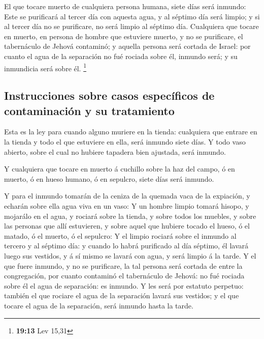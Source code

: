  El que tocare muerto de cualquiera persona humana, siete
días será inmundo:  Este se purificará al tercer día con
aquesta agua, y al séptimo día será limpio; y si al tercer día no se
purificare, no será limpio al séptimo día.  Cualquiera
que tocare en muerto, en persona de hombre que estuviere muerto, y no se
purificare, el tabernáculo de Jehová contaminó; y aquella persona será
cortada de Israel: por cuanto el agua de la separación no fué rociada
sobre él, inmundo será; y su inmundicia será sobre él. \footnote{\textbf{19:13}
  Lev 15,31}

\hypertarget{instrucciones-sobre-casos-especuxedficos-de-contaminaciuxf3n-y-su-tratamiento}{%
\subsection{Instrucciones sobre casos específicos de contaminación y su
tratamiento}\label{instrucciones-sobre-casos-especuxedficos-de-contaminaciuxf3n-y-su-tratamiento}}

 Esta es la ley para cuando alguno muriere en la tienda:
cualquiera que entrare en la tienda y todo el que estuviere en ella,
será inmundo siete días.  Y todo vaso abierto, sobre el
cual no hubiere tapadera bien ajustada, será inmundo.

 Y cualquiera que tocare en muerto á cuchillo sobre la
haz del campo, ó en muerto, ó en hueso humano, ó en sepulcro, siete días
será inmundo.

 Y para el inmundo tomarán de la ceniza de la quemada
vaca de la expiación, y echarán sobre ella agua viva en un vaso:
 Y un hombre limpio tomará hisopo, y mojarálo en el agua,
y rociará sobre la tienda, y sobre todos los muebles, y sobre las
personas que allí estuvieren, y sobre aquel que hubiere tocado el hueso,
ó el matado, ó el muerto, ó el sepulcro:  Y el limpio
rociará sobre el inmundo al tercero y al séptimo día: y cuando lo habrá
purificado al día séptimo, él lavará luego sus vestidos, y á sí mismo se
lavará con agua, y será limpio á la tarde.  Y el que
fuere inmundo, y no se purificare, la tal persona será cortada de entre
la congregación, por cuanto contaminó el tabernáculo de Jehová: no fué
rociada sobre él el agua de separación: es inmundo.  Y
les será por estatuto perpetuo: también el que rociare el agua de la
separación lavará sus vestidos; y el que tocare el agua de la
separación, será inmundo hasta la tarde.

